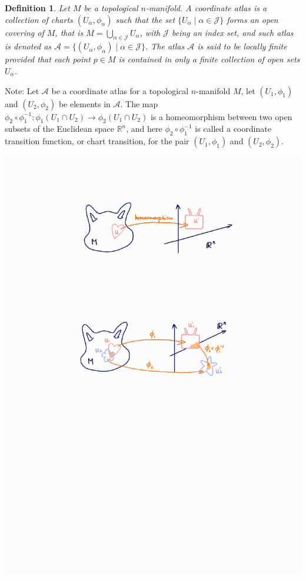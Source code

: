 \documentclass[11pt]{book}
\theoremstyle{break}
\theoremstyle{break}
\newtheorem{defn}{Definition}[corL]
\newcommand{\R}{\mathbb{R}}
\newcommand{\note}{\color{red}Note: \color{black}}
\begin{document}
\begin{defn}
Let $M$ be a topological $n$-manifold. A coordinate atlas is a collection of charts $(U_\alpha, \phi_\alpha)$ such that the set $\{U_\alpha\mid \alpha \in \mathcal{J}\}$ forms an open covering of $M$, that is $M = \bigcup_{\alpha\in\mathcal{J}} U_\alpha$, with $\mathcal{J}$ being an index set, and such atlas is denoted as $\mathcal{A} = \{(U_\alpha, \phi_\alpha)\mid \alpha \in \mathcal{J} \}$. The atlas $\mathcal{A}$ is said to be locally finite provided that each point $p \in M$ is contained in only a finite collection of open sets $U_\alpha$. 
\end{defn}


\note
Let $\mathcal{A}$ be a coordinate atlas for a topological $n$-manifold $M$, let $(U_1,\phi_1)$ and $(U_2,\phi_2)$ be elements in $\mathcal{A}$. The map $\phi_2 \circ \phi_1^{-1}: \phi_1(U_1\cap U_2) \to \phi_2(U_1 \cap U_2)$ is a homeomorphism between two open subsets of the Euclidean space $\R^n$, and here $\phi_2 \circ \phi_1^{-1}$ is called a coordinate transition function, or chart transition, for the pair $(U_1,\phi_1)$ and $(U_2,\phi_2)$.
\begin{center}
\includegraphics[scale=0.69]{transitions}
\end{center}
\end{document}
